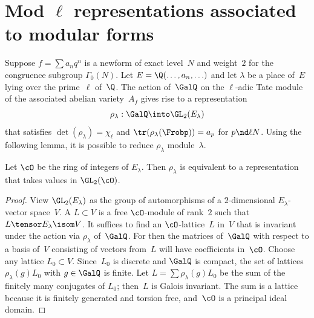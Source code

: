 \documentclass{report}
\begin{document}
\section{Mod $\ell$ representations associated to modular forms}
Suppose $f=\sum a_n q^n$ is a newform of exact level~$N$
and weight~$2$ for the congruence subgroup $\Gamma_0(N)$.
Let $E=\Q(\ldots,a_n,\ldots)$ and let $\lambda$ be a place
of~$E$ lying over the prime~$\ell$ of~$\Q$. The action
of~$\GalQ$ on the $\ell$-adic Tate module of the associated
abelian variety~$A_f$ gives rise to a representation
$$\rho_{\lambda}:\GalQ\into\GL_2(E_{\lambda})$$
that satisfies $\det(\rho_{\lambda})=\chi_{\ell}$ and
$\tr(\rho_{\lambda}(\Frobp))=a_p$ for $p\nd\ell N$.
Using the following lemma, it is possible to reduce
$\rho_{\lambda}$ module~$\lambda$.
\begin{lemma}\label{lem:ovalues}
Let $\cO$ be the ring of integers of $E_{\lambda}$. Then
$\rho_{\lambda}$ is equivalent to a representation that
takes values in $\GL_2(\cO)$.
\end{lemma}
\begin{proof}
View $\GL_2(E_{\lambda})$ as the group of automorphisms
of a $2$-dimensional $E_{\lambda}$-vector space~$V$.
A  $L\subset V$
is a free $\cO$-module of rank~$2$ such that
$L\tensor E_{\lambda}\isom V$.
It suffices to find an $\cO$-lattice~$L$ in~$V$ that
is invariant under the action via $\rho_{\lambda}$
of~$\GalQ$. For then the matrices of~$\GalQ$ with respect
to a basis of~$V$ consisting of vectors from~$L$
will have coefficients in~$\cO$.
Choose any lattice $L_0\subset V$. Since~$L_0$ is
discrete and $\GalQ$ is compact,
the set of  lattices $\rho_{\lambda}(g)L_0$ with $g\in\GalQ$ is
finite.
Let $L=\sum \rho_{\lambda}(g)L_0$ be the sum of
the finitely many conjugates of $L_0$; then~$L$ is Galois invariant.
The sum is a lattice because it is finitely generated and torsion free,
and~$\cO$ is a principal ideal domain.
\end{proof}
\end{document}
